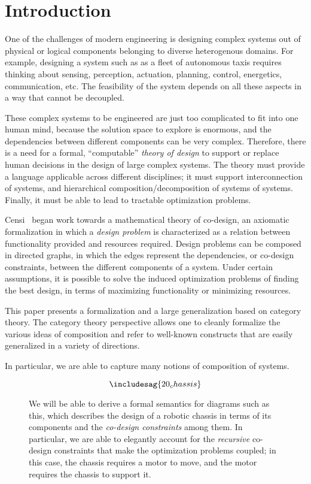 \section{Introduction}

One of the challenges of modern engineering is designing complex systems out
of physical or logical components belonging to diverse heterogenous domains.
For example, designing a system such as as a fleet of autonomous taxis
requires thinking about sensing, perception, actuation, planning, control,
energetics, communication, etc. The feasibility of the system depends on all
these aspects in a way that cannot be decoupled.

These complex systems to be engineered are just too complicated to
fit into one human mind, because the solution space to explore is enormous,
and the dependencies between different components can be very complex.
Therefore, there is a need for a formal, ``computable'' \emph{theory of design} to
support or replace human decisions in the design of large complex systems.
The theory must provide a language applicable across different disciplines;
it  must support interconnection of systems, and hierarchical composition/decomposition of systems of systems. Finally,
it must be able to lead to tractable optimization problems.

Censi~\cite{Censi2017} began work towards a mathematical theory of co-design,
an axiomatic formalization in which a \emph{design problem} is characterized
as a relation between functionality provided and resources required. Design
problems can be composed in directed graphs, in which the edges represent
the dependencies, or co-design constraints, between the different components
of a system. Under certain assumptions, it is possible to solve the induced
optimization problems of finding the best design, in terms of maximizing
functionality or minimizing resources.

This paper presents a formalization and a large generalization based on
category theory. The category theory perspective allows one to cleanly
formalize the various ideas of composition and refer to well-known
constructs that are easily generalized in a variety of directions.

In particular, we are able to capture many notions of composition
of systems.


\begin{figure}[h!]
    \begin{equation}\label{eqn:chassis}
    \includesag{20_chassis}
    \end{equation}
    \caption{
    We will be able to derive a formal semantics for
    diagrams such as this, which describes the design of a robotic
    chassis in terms of its components and the \emph{co-design constraints} among
    them. In particular, we are able to elegantly account for the
    \emph{recursive} co-design constraints that make the optimization problems
    coupled; in this case, the chassis requires a motor to move, and the motor
    requires the chassis to support it.
    }
\end{figure}


